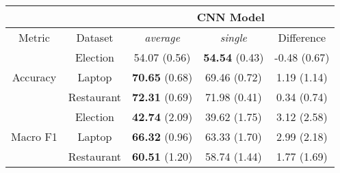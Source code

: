 \begin{tabular}{|c|c|c|c|c|}
\hline
&  &       \multicolumn{3}{c|}{CNN Model} \\
\hline
Metric & Dataset &       \textit{average} &        \textit{single} & Difference \\
\hline
\multirow{3}{*}{Accuracy} & Election &  54.07 (0.56) &  \textbf{54.54} (0.43) & -0.48 (0.67) \\
& Laptop &  \textbf{70.65} (0.68) &  69.46 (0.72) & 1.19 (1.14) \\
& Restaurant &  \textbf{72.31} (0.69) &  71.98 (0.41) & 0.34 (0.74) \\
\hline
\multirow{3}{*}{Macro F1} & Election &  \textbf{42.74} (2.09) &  39.62 (1.75) & 3.12 (2.58) \\
& Laptop &  \textbf{66.32} (0.96) &  63.33 (1.70) & 2.99 (2.18) \\
& Restaurant &  \textbf{60.51} (1.20) &  58.74 (1.44) & 1.77 (1.69) \\
\hline
\end{tabular}